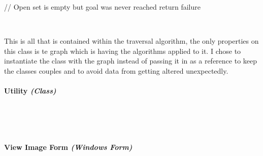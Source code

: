 \begin{FlushLeft}
\begin{pseudocode}
    // Open set is empty but goal was never reached
    return failure
    \end{pseudocode} \\ \BK

    This is all that is contained within the traversal algorithm, the only properties on this class is te graph which is having the algorithms applied to it. I chose to instantiate the class with the graph instead of passing it in as a reference to keep the classes couples and to avoid data from getting altered unexpectedly.
    \bk

    \pagebreak
\paragraph{Utility \textit{(Class)}} \mbox{} \\

    \begin{figure}[H]
        \centering
    \end{figure}\\

    \bk

    \pagebreak
\paragraph{View Image Form \textit{(Windows Form)}} \mbox{} \\


\end{FlushLeft}
